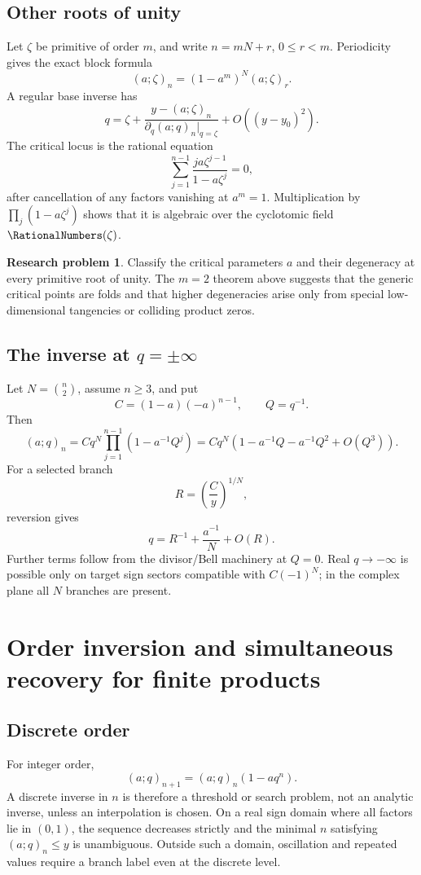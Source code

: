 \documentclass[11pt,letterpaper,oneside,openany]{book}
\theoremstyle{definition}
\newtheorem{researchproblem}[theorem]{Research problem}
\theoremstyle{remark}
\begin{document}
\section{Other roots of unity}
Let \(\zeta\) be primitive of order \(m\), and write \(n=mN+r\),
\(0\le r<m\).  Periodicity gives the exact block formula
\begin{equation}\label{eq:finite-root-block}
 (a;\zeta)_n=(1-a^m)^N(a;\zeta)_r.
\end{equation}
A regular base inverse has
\[
 q=\zeta+\frac{y-(a;\zeta)_n}{\partial_q(a;q)_n|_{q=\zeta}}+O((y-y_0)^2).
\]
The critical locus is the rational equation
\[
 \sum_{j=1}^{n-1}\frac{ja\zeta^{j-1}}{1-a\zeta^j}=0,
\]
after cancellation of any factors vanishing at \(a^m=1\).  Multiplication by
\(\prod_j(1-a\zeta^j)\) shows that it is algebraic over the cyclotomic field
\(\RationalNumbers(\zeta)\).

\begin{researchproblem}
Classify the critical parameters \(a\) and their degeneracy at every primitive
root of unity.  The \(m=2\) theorem above suggests that the generic critical
points are folds and that higher degeneracies arise only from special
low-dimensional tangencies or colliding product zeros.
\end{researchproblem}

\section{The inverse at \texorpdfstring{\(q=\pm\infty\)}{q=+-infinity}}
Let \(N=\binom n2\), assume \(n\ge3\), and put
\[
 C=(1-a)(-a)^{n-1},\qquad Q=q^{-1}.
\]
Then
\[
 (a;q)_n=Cq^N\prod_{j=1}^{n-1}(1-a^{-1}Q^j)
 =Cq^N\left(1-a^{-1}Q-a^{-1}Q^2+O(Q^3)\right).
\]
For a selected branch
\[
 R=\left(\frac{C}{y}\right)^{1/N},
\]
reversion gives
\begin{equation}\label{eq:finite-p-infinity-inverse}
 q=R^{-1}+\frac{a^{-1}}{N}+O(R).
\end{equation}
Further terms follow from the divisor/Bell machinery at \(Q=0\).  Real
\(q\to-\infty\) is possible only on target sign sectors compatible with
\(C(-1)^N\); in the complex plane all \(N\) branches are present.

\chapter{Order inversion and simultaneous recovery for finite products}

\section{Discrete order}
For integer order,
\[
 (a;q)_{n+1}=(a;q)_n(1-aq^n).
\]
A discrete inverse in \(n\) is therefore a threshold or search problem, not an
analytic inverse, unless an interpolation is chosen.  On a real sign domain
where all factors lie in \((0,1)\), the sequence decreases strictly and the
minimal \(n\) satisfying \((a;q)_n\le y\) is unambiguous.  Outside such a
domain, oscillation and repeated values require a branch label even at the
discrete level.
\end{document}
